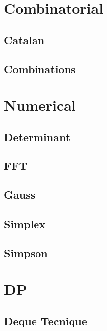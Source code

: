 \section{Combinatorial}
\subsection{Catalan}
\raggedbottom
\hrulefill
\subsection{Combinations}
\raggedbottom
\hrulefill
\newpage

\section{Numerical}
\subsection{Determinant}
\raggedbottom
\hrulefill
\subsection{FFT}
\raggedbottom
\hrulefill
\subsection{Gauss}
\raggedbottom
\hrulefill
\subsection{Simplex}
\raggedbottom
\hrulefill
\subsection{Simpson}
\raggedbottom
\hrulefill
\newpage

\section{DP}
\subsection{Deque Tecnique}
\raggedbottom
\hrulefill
